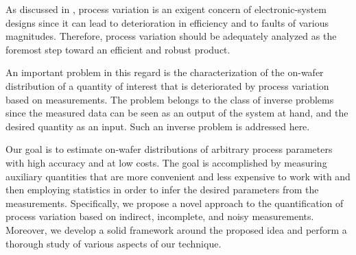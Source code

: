 As discussed in , process variation is an exigent
concern of electronic-system designs since it can lead to deterioration in
efficiency and to faults of various magnitudes. Therefore, process variation
should be adequately analyzed as the foremost step toward an efficient and
robust product.

An important problem in this regard is the characterization of the on-wafer
distribution of a quantity of interest that is deteriorated by process variation
based on measurements. The problem belongs to the class of inverse problems
since the measured data can be seen as an output of the system at hand, and the
desired quantity as an input. Such an inverse problem is addressed here.

Our goal is to estimate on-wafer distributions of arbitrary process parameters
with high accuracy and at low costs. The goal is accomplished by measuring
auxiliary quantities that are more convenient and less expensive to work with
and then employing statistics in order to infer the desired parameters from the
measurements. Specifically, we propose a novel approach to the quantification of
process variation based on indirect, incomplete, and noisy measurements.
Moreover, we develop a solid framework around the proposed idea and perform a
thorough study of various aspects of our technique.
